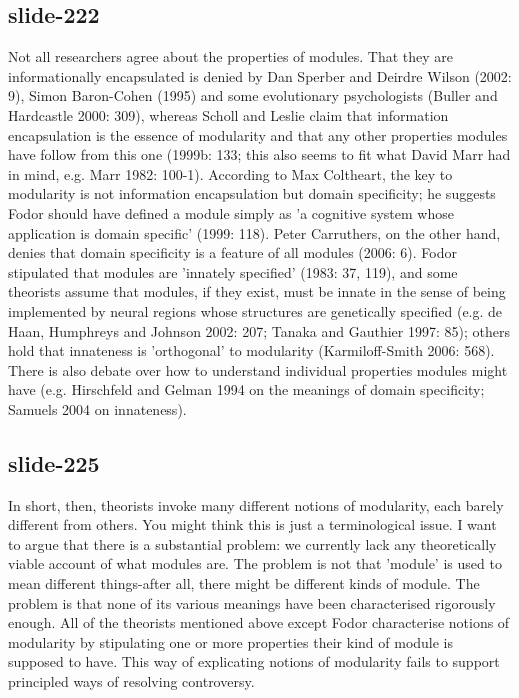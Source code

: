 \documentclass[12pt,\papersize]{extarticle}
\begin{document}
\subsection{slide-222}
Not all researchers agree about the properties of modules.  That they are informationally encapsulated is denied by Dan Sperber and Deirdre Wilson (2002: 9), Simon Baron-Cohen (1995) and some evolutionary psychologists (Buller and Hardcastle 2000: 309), whereas Scholl and Leslie claim that information encapsulation is the essence of modularity and that any other properties modules have follow from this one (1999b: 133; this also seems to fit what David Marr had in mind, e.g. Marr 1982: 100-1).  According to Max Coltheart, the key to modularity is not information encapsulation but domain specificity; he suggests Fodor should have defined a module simply as 'a cognitive system whose application is domain specific' (1999: 118).  Peter Carruthers, on the other hand, denies that domain specificity is a feature of all modules (2006: 6).  Fodor stipulated that modules are 'innately specified' (1983: 37, 119), and some theorists assume that modules, if they exist, must be innate in the sense of being implemented by neural regions whose structures are genetically specified (e.g. de Haan, Humphreys and Johnson 2002: 207; Tanaka and Gauthier 1997: 85); others hold that innateness is 'orthogonal' to modularity (Karmiloff-Smith 2006: 568).  There is also debate over how to understand individual properties modules might have (e.g. Hirschfeld and Gelman 1994 on the meanings of domain specificity; Samuels 2004 on innateness).
 
\subsection{slide-225}
In short, then, theorists invoke many different notions of modularity, each barely different from others.  You might think this is just a terminological issue.  I want to argue that there is a substantial problem: we currently lack any theoretically viable account of what modules are.  The problem is not that 'module' is used to mean different things-after all, there might be different kinds of module.  The problem is that none of its various meanings have been characterised rigorously enough.  All of the theorists mentioned above except Fodor characterise notions of modularity by stipulating one or more properties their kind of module is supposed to have.  This way of explicating notions of modularity fails to support principled ways of resolving controversy.
 
\end{document}
